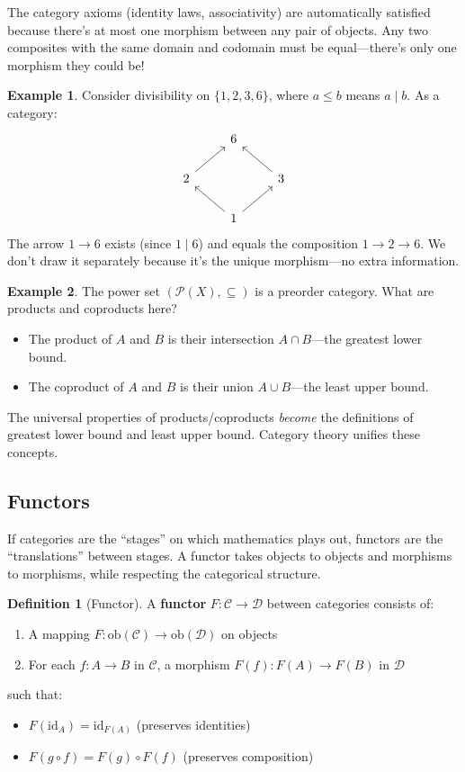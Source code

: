 \documentclass[11pt]{article}
\newcommand{\Pow}{\mathcal{P}}
\newcommand{\ob}{\mathrm{ob}}
\newcommand{\id}{\mathrm{id}}
\theoremstyle{definition}
\newtheorem{definition}{Definition}[section]
\newtheorem{example}{Example}[section]
\theoremstyle{plain}
\theoremstyle{remark}
\begin{document}
The category axioms (identity laws, associativity) are automatically satisfied because there's at most one morphism between any pair of objects. Any two composites with the same domain and codomain must be equal---there's only one morphism they could be!

\begin{example}
Consider divisibility on $\{1, 2, 3, 6\}$, where $a \leq b$ means $a \mid b$. As a category:
\[
\begin{tikzcd}
 & 6 & \\
2 \arrow[ur] & & 3 \arrow[ul] \\
 & 1 \arrow[ul] \arrow[ur] &
\end{tikzcd}
\]
The arrow $1 \to 6$ exists (since $1 \mid 6$) and equals the composition $1 \to 2 \to 6$. We don't draw it separately because it's the unique morphism---no extra information.
\end{example}

\begin{example}
The power set $(\Pow(X), \subseteq)$ is a preorder category. What are products and coproducts here?
\begin{itemize}
  \item The product of $A$ and $B$ is their intersection $A \cap B$---the greatest lower bound.
  \item The coproduct of $A$ and $B$ is their union $A \cup B$---the least upper bound.
\end{itemize}
The universal properties of products/coproducts \emph{become} the definitions of greatest lower bound and least upper bound. Category theory unifies these concepts.
\end{example}

\subsection{Functors}

If categories are the ``stages'' on which mathematics plays out, functors are the ``translations'' between stages. A functor takes objects to objects and morphisms to morphisms, while respecting the categorical structure.

\begin{definition}[Functor]
A \textbf{functor} $F: \mathcal{C} \to \mathcal{D}$ between categories consists of:
\begin{enumerate}
  \item A mapping $F: \ob(\mathcal{C}) \to \ob(\mathcal{D})$ on objects
  \item For each $f: A \to B$ in $\mathcal{C}$, a morphism $F(f): F(A) \to F(B)$ in $\mathcal{D}$
\end{enumerate}
such that:
\begin{itemize}
  \item $F(\id_A) = \id_{F(A)}$ (preserves identities)
  \item $F(g \circ f) = F(g) \circ F(f)$ (preserves composition)
\end{itemize}
\end{definition}
\end{document}
